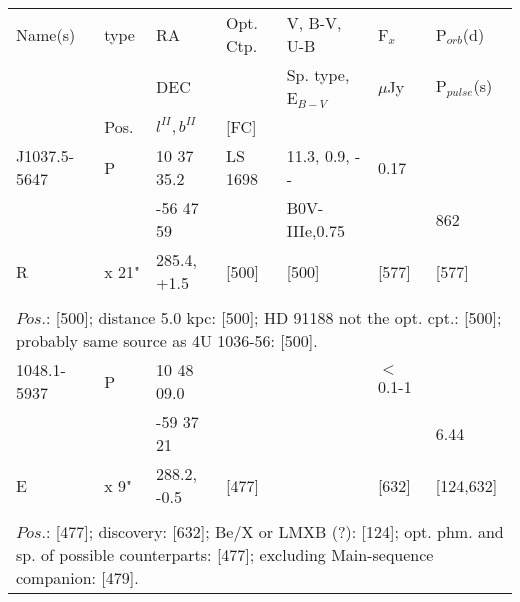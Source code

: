 \documentclass{aa}
\begin{document}
\clearpage\begin{table*}[h]
\begin{tabular}{p{2.5cm}p{1cm}p{1.8cm}p{2.3cm}p{3.3cm}p{2.0cm}p{2.2cm}}
\noalign{\smallskip}
\multicolumn{7}{p{17.5cm}}{Table 1.  (continued) }\\        
\hline
\noalign{\smallskip}
Name(s)      & type  & RA                       &  Opt. Ctp. & V, B-V, U-B                    &   F$_{x}$           & P$_{orb}$(d)    \\
                      &            &  DEC                   &                     &  Sp. type, E$_{B-V}$  &    $\mu$Jy         & P$_{pulse}$(s) \\
                      & Pos.  &  $l^{II}, b^{II}$     &  [FC]           &                                          &                            &                             \\
\noalign{\smallskip} 
\hline
\noalign{\smallskip}
J1037.5-5647    &   P       &   10 37 35.2 &  LS 1698     &     11.3, 0.9, - -          & 0.17              &   \\           
                            &              & -56 47 59    &                       &  B0V-IIIe,0.75         &                       &     862  \\
R                         & x 21"   & 285.4, +1.5  &    [500]        &             [500]               &     [577]          &   [577] \\
  
\\
\multicolumn{7}{p{17.5cm}}{
$Pos$.: [500]; distance 5.0 kpc: [500]; HD 91188 not the opt. cpt.: [500]; probably same source as 4U 1036-56: [500].        }\\

\noalign{\smallskip}
\hline
\noalign{\smallskip}
1048.1-5937     &   P     & 10 48 09.0     &                  &                   & $<$0.1-1       &                        \\
                           &           & -59 37 21       &                  &                   &                        &  6.44               \\
    E                    &  x 9"  & 288.2, -0.5     &   [477]      &                   &   [632]           & [124,632]       \\
\\
\multicolumn{7}{p{17.5cm}}{
$Pos$.: [477]; discovery: [632]; Be/X or LMXB (?): [124]; opt. phm. and sp. of possible counterparts: [477]; 
excluding Main-sequence companion: [479].}\\


\end{tabular}
\end{table*}
\end{document}
